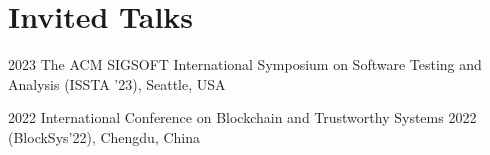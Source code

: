 \documentclass[12pt,letterpaper]{report}
\begin{document}
    \section*{Invited Talks}
    \begin{tablist}
        \item[2023] \tab{}The ACM SIGSOFT International Symposium on Software Testing and Analysis (ISSTA '23), Seattle, USA
        \item[2022] \tab{}International Conference on Blockchain and Trustworthy Systems 2022 (BlockSys'22), Chengdu, China
    \end{tablist}



\end{document}
